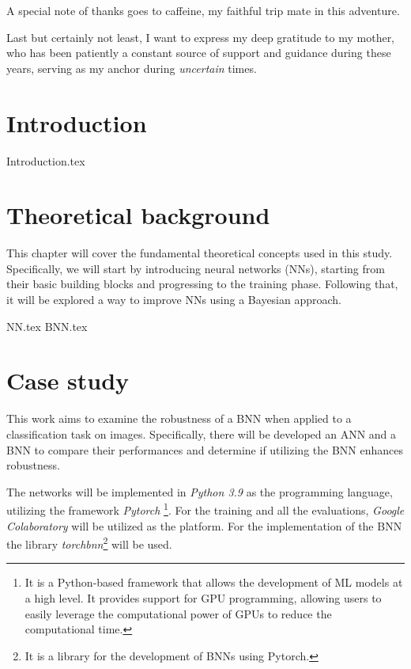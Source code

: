 \documentclass[
	12pt,
	a4paper,
	cleardoublepage=empty,
	headings=twolinechapter,
	numbers=autoenddot,
]{scrbook}
\newcommand\blankpage{%
	\null
	\thispagestyle{empty}%
	\addtocounter{page}{-1}%
	\newpage}
\begin{document}
	A special note of thanks goes to caffeine, my faithful trip mate in this adventure.
	
	Last but certainly not least, I want to express my deep gratitude to my mother, who has been patiently a constant source of support and guidance during these years, serving as my anchor during \textit{uncertain} times.
	
	\tableofcontents
	\listoffigures
	\listoftables
	
	\afterpage{\blankpage}
	
	\mainmatter	

	\chapter{Introduction}
	{Introduction.tex}
	
	\chapter{Theoretical background}
	This chapter will cover the fundamental theoretical concepts used in this study. Specifically, we will start by introducing neural networks (NNs), starting from their basic building blocks and progressing to the training phase. Following that, it will be explored a way to improve NNs using a Bayesian approach.
	
	{NN.tex}
	{BNN.tex}
		
	\chapter{Case study}
	This work aims to examine the robustness of a BNN when applied to a classification task on images. Specifically, there will be developed an ANN and a BNN to compare their performances and determine if utilizing the BNN enhances robustness.
	
	The networks will be implemented in \textit{Python 3.9} as the programming language, utilizing the framework \textit{Pytorch} \footnote{It is a Python-based framework that allows the development of ML models at a high level. It provides support for GPU programming, allowing users to easily leverage the computational power of GPUs to reduce the computational time.}\cite{NEURIPS2019_9015}. 
	For the training and all the evaluations, \textit{Google Colaboratory} will be utilized as the platform. For the implementation of the BNN the library \textit{torchbnn}\footnote{It is a library for the development of BNNs using Pytorch.}\cite{Torchbnn} will be used.
	
\end{document}

